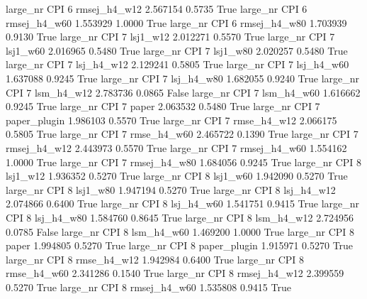   large_nr      CPI                 6 rmsej_h4_w12    2.567154      0.5735    True
  large_nr      CPI                 6 rmsej_h4_w60    1.553929      1.0000    True
  large_nr      CPI                 6 rmsej_h4_w80    1.703939      0.9130    True
  large_nr      CPI                 7     lsj1_w12    2.012271      0.5570    True
  large_nr      CPI                 7     lsj1_w60    2.016965      0.5480    True
  large_nr      CPI                 7     lsj1_w80    2.020257      0.5480    True
  large_nr      CPI                 7   lsj_h4_w12    2.129241      0.5805    True
  large_nr      CPI                 7   lsj_h4_w60    1.637088      0.9245    True
  large_nr      CPI                 7   lsj_h4_w80    1.682055      0.9240    True
  large_nr      CPI                 7   lsm_h4_w12    2.783736      0.0865   False
  large_nr      CPI                 7   lsm_h4_w60    1.616662      0.9245    True
  large_nr      CPI                 7        paper    2.063532      0.5480    True
  large_nr      CPI                 7 paper_plugin    1.986103      0.5570    True
  large_nr      CPI                 7  rmse_h4_w12    2.066175      0.5805    True
  large_nr      CPI                 7  rmse_h4_w60    2.465722      0.1390    True
  large_nr      CPI                 7 rmsej_h4_w12    2.443973      0.5570    True
  large_nr      CPI                 7 rmsej_h4_w60    1.554162      1.0000    True
  large_nr      CPI                 7 rmsej_h4_w80    1.684056      0.9245    True
  large_nr      CPI                 8     lsj1_w12    1.936352      0.5270    True
  large_nr      CPI                 8     lsj1_w60    1.942090      0.5270    True
  large_nr      CPI                 8     lsj1_w80    1.947194      0.5270    True
  large_nr      CPI                 8   lsj_h4_w12    2.074866      0.6400    True
  large_nr      CPI                 8   lsj_h4_w60    1.541751      0.9415    True
  large_nr      CPI                 8   lsj_h4_w80    1.584760      0.8645    True
  large_nr      CPI                 8   lsm_h4_w12    2.724956      0.0785   False
  large_nr      CPI                 8   lsm_h4_w60    1.469200      1.0000    True
  large_nr      CPI                 8        paper    1.994805      0.5270    True
  large_nr      CPI                 8 paper_plugin    1.915971      0.5270    True
  large_nr      CPI                 8  rmse_h4_w12    1.942984      0.6400    True
  large_nr      CPI                 8  rmse_h4_w60    2.341286      0.1540    True
  large_nr      CPI                 8 rmsej_h4_w12    2.399559      0.5270    True
  large_nr      CPI                 8 rmsej_h4_w60    1.535808      0.9415    True
